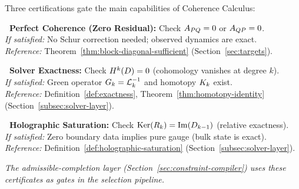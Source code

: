 \begin{tcolorbox}[colback=white, colframe=black!70, title={Certificate Checklist}]
\label{box:certificate-checklist}
Three certifications gate the main capabilities of Coherence Calculus:

\smallskip
\textbf{\CertA\ Perfect Coherence (Zero Residual):}
Check $A_{PQ} = 0$ or $A_{QP} = 0$.\\
\emph{If satisfied:} No Schur correction needed; observed dynamics are exact.\\
\emph{Reference:} Theorem~\ref{thm:block-diagonal-sufficient} (Section~\ref{sec:targets}).

\smallskip
\textbf{\CertB\ Solver Exactness:}
Check $H^{k}(D) = 0$ (cohomology vanishes at degree $k$).\\
\emph{If satisfied:} Green operator $G_{k} = \mathcal{L}_{k}^{-1}$ and homotopy $K_{k}$ exist.\\
\emph{Reference:} Definition~\ref{def:exactness}, Theorem~\ref{thm:homotopy-identity} (Section~\ref{subsec:solver-layer}).

\smallskip
\textbf{\CertC\ Holographic Saturation:}
Check $\mathrm{Ker}(R_k) = \mathrm{Im}(D_{k-1})$ (relative exactness).\\
\emph{If satisfied:} Zero boundary data implies pure gauge (bulk state is exact).\\
\emph{Reference:} Definition~\ref{def:holographic-saturation} (Section~\ref{subsec:solver-layer}).

\smallskip
\emph{The admissible-completion layer (Section~\ref{sec:constraint-compiler}) uses these certificates as gates in the selection pipeline.}
\end{tcolorbox}


